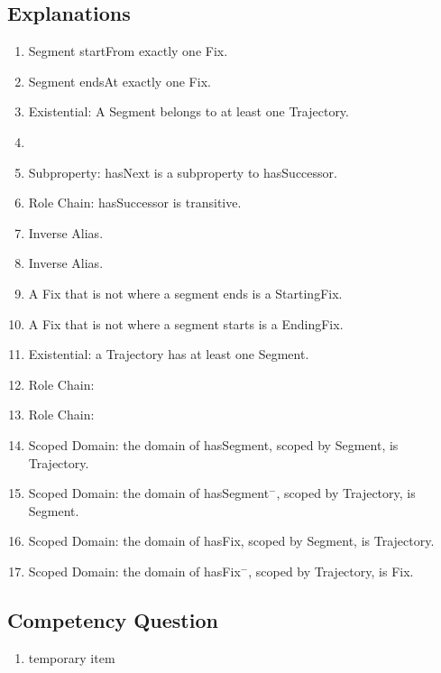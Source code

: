 \subsection{Explanations}
\label{exp:Trajectory}
\begin{enumerate}
\item \textsf{Segment} \textsf{startFrom} exactly one \textsf{Fix}.
\item \textsf{Segment} \textsf{endsAt} exactly one \textsf{Fix}.
\item Existential: A \textsf{Segment} belongs to at least one \textsf{Trajectory}.
\item
\item Subproperty: \textsf{hasNext} is a subproperty to \textsf{hasSuccessor}.
\item Role Chain: \textsf{hasSuccessor} is transitive.
\item Inverse Alias.
\item Inverse Alias.
\item A \textsf{Fix} that is not where a segment ends is a \textsf{StartingFix}.
\item A \textsf{Fix} that is not where a segment starts is a \textsf{EndingFix}.
\item Existential: a \textsf{Trajectory} has at least one \textsf{Segment}.
\item Role Chain: 
\item Role Chain:
\item Scoped Domain: the domain of \textsf{hasSegment}, scoped by \textsf{Segment}, is \textsf{Trajectory}.
\item Scoped Domain: the domain of \textsf{hasSegment}$^-$, scoped by \textsf{Trajectory}, is \textsf{Segment}.
\item Scoped Domain: the domain of \textsf{hasFix}, scoped by \textsf{Segment}, is \textsf{Trajectory}.
\item Scoped Domain: the domain of \textsf{hasFix}$^-$, scoped by \textsf{Trajectory}, is \textsf{Fix}.
\end{enumerate}

\subsection{Competency Question}
\label{cqs:Trajectory}
\begin{enumerate}[CQ1.]
\item temporary item
\end{enumerate}

\newpage
